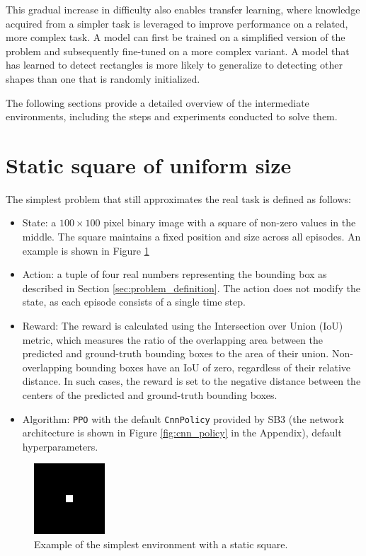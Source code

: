 \documentclass[
  digital,     %
  oneside,     %
  nosansbold,  %
  nocolorbold, %
  lof,         %
  lot,         %
]{fithesis4}
\begin{document}
This gradual increase in difficulty also enables transfer learning, where knowledge acquired from a simpler task is leveraged to improve performance on a related, more complex task. A model can first be trained on a simplified version of the problem and subsequently fine-tuned on a more complex variant. A model that has learned to detect rectangles is more likely to generalize to detecting other shapes than one that is randomly initialized.

The following sections provide a detailed overview of the intermediate environments, including the steps and experiments conducted to solve them.

\section{Static square of uniform size}
The simplest problem that still approximates the real task is defined as follows:
\begin{itemize}
    \item State: a $100\times100$ pixel binary image with a square of non-zero values in the middle. The square maintains a fixed position and size across all episodes. An example is shown in Figure \ref{fig:env0}
    \item Action: a tuple of four real numbers representing the bounding box as described in Section \ref{sec:problem_definition}. The action does not modify the state, as each episode consists of a single time step.
    \item Reward: The reward is calculated using the Intersection over Union (IoU) metric, which measures the ratio of the overlapping area between the predicted and ground-truth bounding boxes to the area of their union. Non-overlapping bounding boxes have an IoU of zero, regardless of their relative distance. In such cases, the reward is set to the negative distance between the centers of the predicted and ground-truth bounding boxes.
    \item Algorithm: \texttt{PPO} with the default \texttt{CnnPolicy} provided by SB3 (the network architecture is shown in Figure \ref{fig:cnn_policy} in the Appendix), default hyperparameters.
\end{itemize}

\begin{figure}
    \includegraphics[width=0.25\linewidth]{env_examples/env0.jpg}
    \caption{Example of the simplest environment with a static square.}
    \label{fig:env0}
\end{figure}
\end{document}
